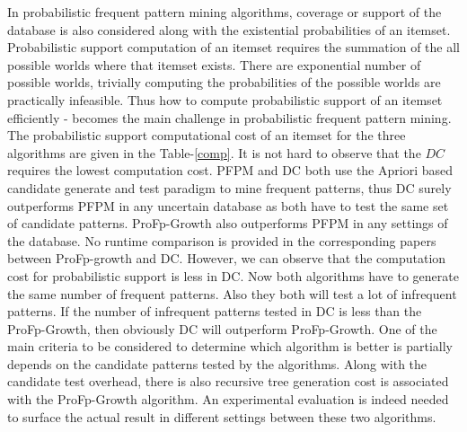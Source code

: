 In probabilistic frequent pattern mining algorithms, coverage or support of the database is also considered along with the existential probabilities of an itemset. Probabilistic support computation of an itemset requires the summation of the all possible worlds where that itemset exists. There are exponential number of possible worlds, trivially computing the probabilities of the possible worlds are practically infeasible. Thus how to compute probabilistic support of an itemset efficiently - becomes the main challenge in probabilistic frequent pattern mining. The probabilistic support computational cost of an itemset for the three algorithms are given in the Table-\ref{comp}. It is not hard to observe that the $DC$ requires the lowest computation cost. PFPM and DC both use the Apriori based candidate generate and test paradigm to mine frequent patterns, thus DC surely outperforms PFPM in any uncertain database as both have to test the same set of candidate patterns. ProFp-Growth also outperforms PFPM in any settings of the database. No runtime comparison is provided in  the corresponding papers between ProFp-growth and DC. However, we can observe that the computation cost for probabilistic support is less in DC. Now both algorithms have to generate the same number of frequent patterns. Also they both will test a lot of infrequent patterns. If the number of infrequent patterns tested in DC is less than the ProFp-Growth, then obviously DC will outperform ProFp-Growth. One of the main criteria to be considered to determine which algorithm is better is partially depends on the candidate patterns tested by the algorithms. Along with the candidate test overhead, there is also recursive tree generation cost is associated with the ProFp-Growth algorithm. An experimental evaluation is indeed needed to surface the actual result in different settings between these two algorithms.

